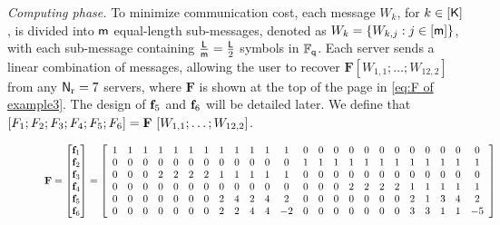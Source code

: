 \documentclass[conference,letterpaper]{IEEEtran}
\begin{document}
\begin{example}
{\it Computing phase.}
To minimize communication cost, each message $W_k$, for $k \in [{\sf K}]$, is divided into ${\sf m}$ equal-length sub-messages, denoted as $W_k = \{W_{k,j} : j \in [{\sf m}]\}$, with each sub-message containing $\frac{{\sf L}}{{\sf m}} = \frac{{\sf L}}{2}$ symbols in $\mathbb{F}_{{\sf q}}$. Each server sends a linear combination of messages, allowing the user to recover
\(\mathbf{F} [W_{1,1}; \ldots; W_{12,2}]\) from any \({\sf N}_{\rm r} = 7\) servers, where
\(\mathbf{F}\) is shown at the top of the page in \eqref{eq:F of example3}. The design of \({\bf f}_5\) and \({\bf f}_6\) will be detailed later.
We define that $[F_1;F_2;F_3;F_4;F_5;F_6]=  {\bf F} \  [W_{1,1};\ldots;W_{12,2}] $.
\begin{figure}
\begin{equation}
\scalebox{0.8}{%
\(
{\bf F} = \begin{bmatrix}  
 {\fv}_1 \\
 {\fv}_2 \\
 {\fv}_3 \\
 {\fv}_4\\
 {\fv}_5 \\
 {\fv}_6
\end{bmatrix}
=
\left[
\begin{array}{cccccccccccccccccccccccc}
  1 & 1 & 1 & 1 & 1 & 1 & 1 & 1 & 1 & 1 & 1 & 1 & 0 & 0 & 0 & 0 & 0 & 0 & 0 & 0 & 0 & 0 & 0 & 0 \\
  0 & 0 & 0 & 0 & 0 & 0 & 0 & 0 & 0 & 0 & 0 & 0 & 1 & 1 & 1 & 1 & 1 & 1 & 1 & 1 & 1 & 1 & 1 & 1 \\
  0 & 0 & 0 & 2 & 2 & 2 & 2 & 1 & 1 & 1 & 1 & 1 & 0 & 0 & 0 & 0 & 0 & 0 & 0 & 0 & 0 & 0 & 0 & 0 \\
  0 & 0 & 0 & 0 & 0 & 0 & 0 & 0 & 0 & 0 & 0 & 0 & 0 & 0 & 0 & 2 & 2 & 2 & 2 & 1 & 1 & 1 & 1 & 1 \\
  0 & 0 & 0 & 0 & 0 & 0 & 0 & 2 & 4 & 2 & 4 & 2 & 0 & 0 & 0 & 0 & 0 & 0 & 0 & 2 & 1 & 3 & 4 & 2 \\
  0 & 0 & 0 & 0 & 0 & 0 & 0 & 2 & 2 & 4 & 4 & -2 & 0 & 0 & 0 & 0 & 0 & 0 & 0 & 3 & 3 & 1 & 1 & -5 \\
\end{array}
\right]
\)
}
\label{eq:F of example3}
\end{equation}
\end{figure}



\end{example}
\end{document}
